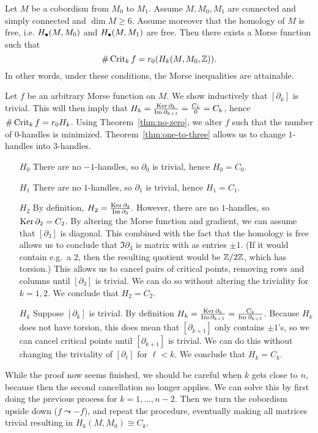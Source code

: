 \begin{theorem}[Smale]
    Let $M$ be a cobordism from $M_0$ to $M_1$.
    Assume $M, M_0, M_1$ are connected and simply connected and $\dim M \ge 6$.
    Assume moreover that the homology of $M$ is free, i.e.  $H_{\bullet}(M, M_0)$ and $H_{\bullet}(M, M_1)$ are free.
    Then there exists a Morse function such that
    \[
        \# \operatorname{Crit}_k f = r_0(H_k(M, M_0, \mathbb{Z}))
    .\] 
    In other words, under these conditions, the Morse inequalities are attainable.
    \label{thm:minimal-cob}
\end{theorem}
\begin{myproof}
    Let $f$ be an arbitrary Morse function on $M$.
    We show inductively that $[\partial_k]$ is trivial.
    This will then imply that $H_k = \frac{\operatorname{Ker} \partial_k}{\operatorname{Im} \partial_{k+1}} = \frac{C_k}{0} = C_k$, hence $\# \operatorname{Crit}_kf = r_0 H_k$.
    Using Theorem~\ref{thm:no-zero}, we alter $f$ such that the number of $0$-handles is minimized. Theorem~\ref{thm:one-to-three} allows us to change $1$-handles into $3$-handles.
    \begin{enumerate}
        \item[$H_0$]
            There are no $-1$-handles, so  $\partial_0$ is trivial, hence  $H_0 = C_0$.
        \item[$H_1$]
            There are no $1$-handles, so $\partial_1$ is trivial, hence  $H_1 = C_1$.
        \item[$ H_2$]
            By definition, $H_2 = \frac{\operatorname{Ker} \partial_2}{\operatorname{Im} \partial_3}$.
            However, there are no $1$-handles,
            so $\operatorname{Ker} \partial_2 = C_2$.
            By altering the Morse function and gradient, we can assume that $[\partial_3]$ is diagonal.
            This combined with the fact that the homology is free allows us to conclude that $\Im \partial_3$ is matrix with as entries $\pm 1$.
            (If it would contain e.g.\ a $2$, then the resulting quotient would be  $\mathbb{Z} / 2 \mathbb{Z}$, which has torsion.)
            This allows us to cancel pairs of critical points, removing rows and columns until $[\partial_3]$ is trivial.
            We can do so without altering the triviality for $k = 1,2$.
            We conclude that $H_2 = C_2$.
        \item [$H_k$]
            Suppose $[\partial_k]$ is trivial.
            By definition $H_k = \frac{\operatorname{Ker} \partial_k}{\operatorname{Im} \partial_{k+1}} = \frac{C_k}{\operatorname{Im} \partial_{k+1}}$.
            Because $H_k$ does not have torsion, this does mean that $[\partial_{k+1}]$ only contains $\pm 1$'s, so we can cancel critical points until  $[\partial_{k+1}]$ is trivial. We can do this without changing the triviality of $[\partial_\ell]$ for $\ell < k$.
            We conclude that $H_k = C_k$.
    \end{enumerate}
    While the proof now seems finished, we should be careful when $k$ gets close to  $n$, because then the second cancellation no longer applies.
    We can solve this by first doing the previous process for $k = 1, \ldots, n-2$. 
    Then we turn the cobordism upside down ($f \leadsto -f$), and repeat the procedure, eventually making all matrices trivial resulting in $H_k(M, M_0) \cong C_k$.
\end{myproof}
